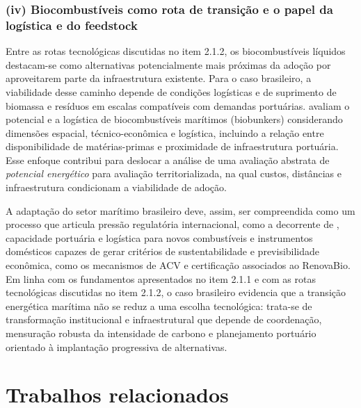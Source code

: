 \subsubsection{(iv) Biocombustíveis como rota de transição e o papel da logística e do feedstock}
Entre as rotas tecnológicas discutidas no item 2.1.2, os biocombustíveis líquidos destacam-se como alternativas potencialmente mais próximas da adoção por aproveitarem parte da infraestrutura existente. Para o caso brasileiro, a viabilidade desse caminho depende de condições logísticas e de suprimento de biomassa e resíduos em escalas compatíveis com demandas portuárias. \citet{carvalho_biofuels_2021} avaliam o potencial e a logística de biocombustíveis marítimos (biobunkers) considerando dimensões espacial, técnico-econômica e logística, incluindo a relação entre disponibilidade de matérias-primas e proximidade de infraestrutura portuária. Esse enfoque contribui para deslocar a análise de uma avaliação abstrata de \emph{potencial energético} para avaliação territorializada, na qual custos, distâncias e infraestrutura condicionam a viabilidade de adoção.

A adaptação do setor marítimo brasileiro deve, assim, ser compreendida como um processo que articula pressão regulatória internacional, como a decorrente de \citep{imo_imo_2020}, capacidade portuária e logística para novos combustíveis e instrumentos domésticos capazes de gerar critérios de sustentabilidade e previsibilidade econômica, como os mecanismos de \gls{ACV} e certificação associados ao RenovaBio. Em linha com os fundamentos apresentados no item 2.1.1 e com as rotas tecnológicas discutidas no item 2.1.2, o caso brasileiro evidencia que a transição energética marítima não se reduz a uma escolha tecnológica: trata-se de transformação institucional e infraestrutural que depende de coordenação, mensuração robusta da intensidade de carbono e planejamento portuário orientado à implantação progressiva de alternativas.

\section{Trabalhos relacionados}

